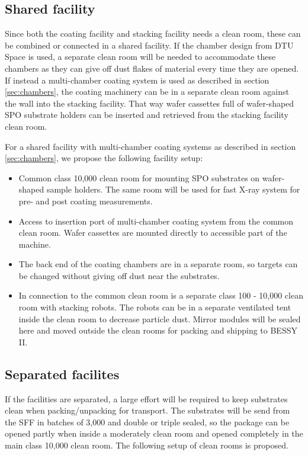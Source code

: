 \subsection{Shared facility}
Since both the coating facility and stacking facility needs a clean room, these can be combined or connected in a shared facility. If the chamber design from DTU Space is used, a separate clean room will be needed to accommodate these chambers as they can give off dust flakes of material every time they are opened. If instead a multi-chamber coating system is used as described in section \ref{sec:chambers}, the coating machinery can be in a separate clean room against the wall into the stacking facility. That way wafer cassettes full of wafer-shaped SPO substrate holders can be inserted and retrieved from the stacking facility clean room.

For a shared facility with multi-chamber coating systems as described in section \ref{sec:chambers}, we propose the following facility setup:

\begin{itemize}
	\item Common class 10,000 clean room for mounting SPO substrates on wafer-shaped sample holders. The same room will be used for fast X-ray system for pre- and post coating measurements.
	\item Access to insertion port of multi-chamber coating system from the common clean room. Wafer cassettes are mounted directly to accessible part of the machine.
	\item The back end of the coating chambers are in a separate room, so targets can be changed without giving off dust near the substrates.
	\item In connection to the common clean room is a separate class 100 - 10,000 clean room with stacking robots. The robots can be in a separate ventilated tent inside the clean room to decrease particle dust. Mirror modules will be sealed here and moved outside the clean rooms for packing and shipping to BESSY II.
\end{itemize}

\subsection{Separated facilites}
If the facilities are separated, a large effort will be required to keep substrates clean when packing/unpacking for transport. The substrates will be send from the SFF in batches of 3,000 and double or triple sealed, so the package can be opened partly when inside a moderately clean room and opened completely in the main class 10,000 clean room. The following setup of clean rooms is proposed.

